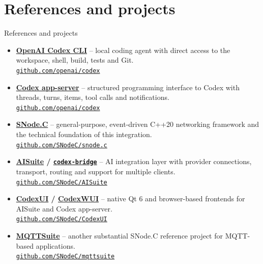 \documentclass[\fhformat,10pt]{fh-ooe}
\newcommand{\SNodeCLink}{\href{https://github.com/SNodeC/snode.c}{SNode.C}}
\newcommand{\AISuiteLink}{\href{https://github.com/SNodeC/AISuite}{AISuite}}
\newcommand{\CodexBridgeLink}{\href{https://github.com/SNodeC/AISuite}{\texttt{codex-bridge}}}
\newcommand{\CodexUILink}{\href{https://github.com/SNodeC/CodexUI}{CodexUI}}
\newcommand{\CodexWUILink}{\href{https://github.com/SNodeC/CodexUI}{CodexWUI}}
\newcommand{\MQTTSuiteLink}{\href{https://github.com/SNodeC/mqttsuite}{MQTTSuite}}
\begin{document}
\section{References and projects}
\begin{frame}{References and projects}
\small
\begin{itemize}
  \item \textbf{\href{https://github.com/openai/codex}{OpenAI Codex CLI}} -- local coding agent with direct access to the workspace, shell, build, tests and Git.\\[-0.05em]
        \href{https://github.com/openai/codex}{\texttt{github.com/openai/codex}}
  \item \textbf{\href{https://github.com/openai/codex}{Codex app-server}} -- structured programming interface to Codex with threads, turns, items, tool calls and notifications.\\[-0.05em]
        \href{https://github.com/openai/codex}{\texttt{github.com/openai/codex}}
  \item \textbf{\SNodeCLink} -- general-purpose, event-driven C++20 networking framework and the technical foundation of this integration.\\[-0.05em]
        \href{https://github.com/SNodeC/snode.c}{\texttt{github.com/SNodeC/snode.c}}
  \item \textbf{\AISuiteLink{} / \CodexBridgeLink} -- AI integration layer with provider connections, transport, routing and support for multiple clients.\\[-0.05em]
        \href{https://github.com/SNodeC/AISuite}{\texttt{github.com/SNodeC/AISuite}}
  \item \textbf{\CodexUILink{} / \CodexWUILink} -- native Qt 6 and browser-based frontends for AISuite and Codex app-server.\\[-0.05em]
        \href{https://github.com/SNodeC/CodexUI}{\texttt{github.com/SNodeC/CodexUI}}
  \item \textbf{\MQTTSuiteLink} -- another substantial SNode.C reference project for MQTT-based applications.\\[-0.05em]
        \href{https://github.com/SNodeC/mqttsuite}{\texttt{github.com/SNodeC/mqttsuite}}
\end{itemize}
\end{frame}
\end{document}
